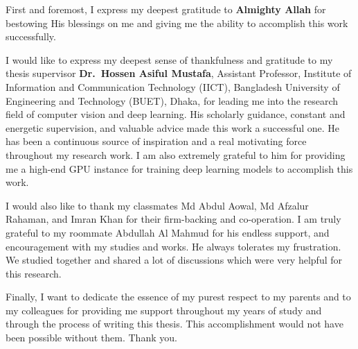 
First and foremost, I express my deepest gratitude to \textbf{Almighty Allah} for bestowing His blessings on me and giving me the ability to accomplish this work successfully. 

I would like to express my deepest sense of thankfulness and gratitude to my thesis supervisor \textbf{Dr.\ Hossen Asiful Mustafa}, Assistant Professor, Institute of Information and Communication Technology (IICT), Bangladesh University of Engineering and Technology (BUET), Dhaka, for leading me into the research field of computer vision and deep learning. His scholarly guidance, constant and energetic supervision, and valuable advice made this work a successful one. He has been a continuous source of inspiration and a real motivating force throughout my research work. I am also extremely grateful to him for providing me a high-end GPU instance for training deep learning models to accomplish this work. 

I would also like to thank my classmates Md Abdul Aowal, Md Afzalur Rahaman, and Imran Khan for their firm-backing and co-operation. I am truly grateful to my roommate Abdullah Al Mahmud for his endless support, and encouragement with my studies and works. He always tolerates my frustration. We studied together and shared a lot of discussions which were very helpful for this research.

Finally, I want to dedicate the essence of my purest respect to my parents and to my colleagues for providing me support throughout my years of study and through the process of writing this thesis. This accomplishment would not have been possible without them. Thank you.


\endinput

